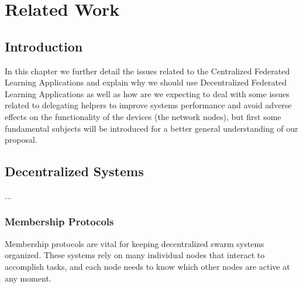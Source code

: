 

\chapter{Related Work}
\label{cha:users_manual}

\glsresetall


\section{Introduction}
\label{sec:introduction}

In this chapter we further detail the issues related to the Centralized Federated Learning Applications and explain why we should use Decentralized Federated Learning Applications as well as how are we expecting to deal with some issues related to delegating helpers to improve systems performance and avoid adverse effects on the functionality of the devices (the network nodes), but first some fundamental subjects will be introduced for a better general understanding of our proposal.


\section{Decentralized Systems}
\label{sec:decentralised_systems}

...

\subsection{Membership Protocols}
\label{sub:membership_protocols}

Membership protocols are vital for keeping decentralized swarm systems organized. These systems rely on many individual nodes that interact to accomplish tasks, and each node needs to know which other nodes are active at any moment. 

